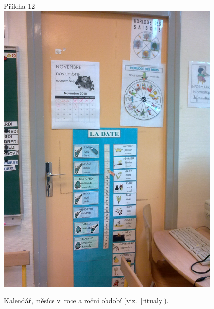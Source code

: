 	\begin{figure}[tb]
		\centering
		Příloha 12\\
		\includegraphics[height=0.35\textheight]{./fotky/Obr12.jpg}
		\caption{
			Kalendář, měsíce v~roce a roční období (viz.~\ref{ritualy}).
		}
		\label{Obr12}
	\end{figure}

